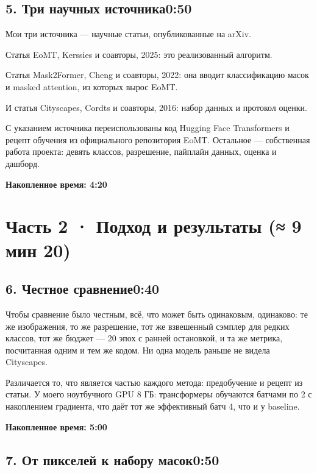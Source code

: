 \documentclass[11pt,a4paper]{article}
\newcommand{\cumul}[1]{\par{\hfill\small\color{accent}\bfseries #1}\par}
\newcommand{\tempo}[1]{\hfill{\normalsize\color{accent}#1}}
\begin{document}
\subsection*{5. Три научных источника\tempo{0:50}}

Мои три источника — научные статьи, опубликованные на arXiv.

Статья EoMT, Kerssies и соавторы, 2025: это реализованный алгоритм.

Статья Mask2Former, Cheng и соавторы, 2022: она вводит классификацию масок и masked attention, из которых вырос EoMT.

И статья Cityscapes, Cordts и соавторы, 2016: набор данных и протокол оценки.

С указанием источника переиспользованы код Hugging Face Transformers и рецепт обучения из официального репозитория EoMT. Остальное — собственная работа проекта: девять классов, разрешение, пайплайн данных, оценка и дашборд.

\cumul{Накопленное время: 4:20}

\medskip{\color{linec}\rule{\linewidth}{0.5pt}}\medskip

\section*{Часть 2 · Подход и результаты (≈ 9 мин 20)}

\subsection*{6. Честное сравнение\tempo{0:40}}

Чтобы сравнение было честным, всё, что может быть одинаковым, одинаково: те же изображения, то же разрешение, тот же взвешенный сэмплер для редких классов, тот же бюджет — 20 эпох с ранней остановкой, и та же метрика, посчитанная одним и тем же кодом. Ни одна модель раньше не видела Cityscapes.

Различается то, что является частью каждого метода: предобучение и рецепт из статьи. У моего ноутбучного GPU 8 ГБ: трансформеры обучаются батчами по 2 с накоплением градиента, что даёт тот же эффективный батч 4, что и у baseline.

\cumul{Накопленное время: 5:00}

\subsection*{7. От пикселей к набору масок\tempo{0:50}}
\end{document}
